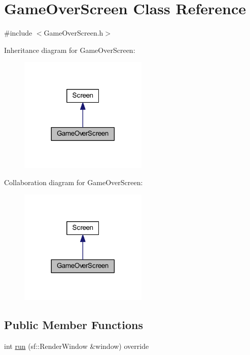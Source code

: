 \hypertarget{class_game_over_screen}{}\section{Game\+Over\+Screen Class Reference}
\label{class_game_over_screen}


{\ttfamily \#include $<$Game\+Over\+Screen.\+h$>$}



Inheritance diagram for Game\+Over\+Screen\+:\nopagebreak
\begin{figure}[H]
\begin{center}
\leavevmode
\includegraphics[width=173pt]{class_game_over_screen__inherit__graph}
\end{center}
\end{figure}


Collaboration diagram for Game\+Over\+Screen\+:\nopagebreak
\begin{figure}[H]
\begin{center}
\leavevmode
\includegraphics[width=173pt]{class_game_over_screen__coll__graph}
\end{center}
\end{figure}
\subsection*{Public Member Functions}
\begin{DoxyCompactItemize}
\item 
int \hyperlink{class_game_over_screen_aff38f34b95835895e285c735c5c9f3c7}{run} (sf\+::\+Render\+Window \&window) override
\end{DoxyCompactItemize}


